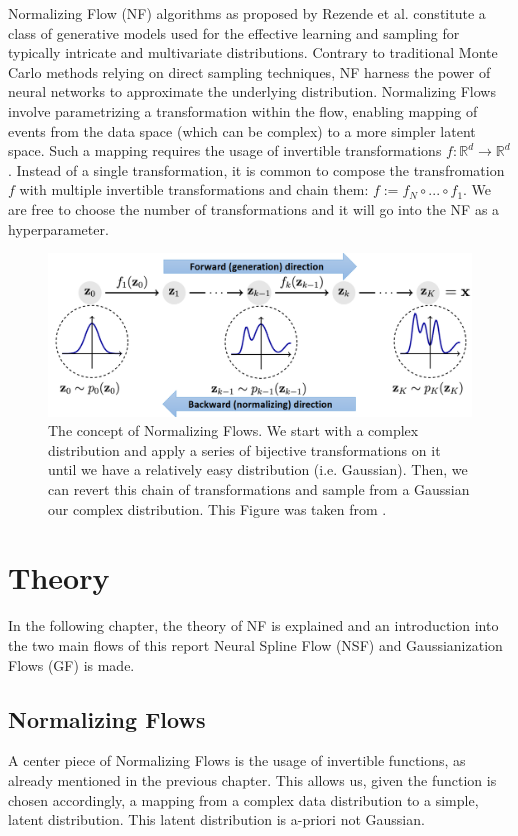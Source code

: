 \documentclass[
nofootinbib,
 amsmath,amssymb,
 aps,
]{revtex4-2}
\begin{document}
Normalizing Flow (NF) algorithms as proposed by Rezende et al. \cite{NF} constitute a class of generative models used for the effective learning and sampling for typically intricate and multivariate distributions. Contrary to traditional Monte Carlo methods relying on direct sampling techniques, NF harness the power of neural networks to approximate the underlying distribution. Normalizing Flows involve parametrizing a transformation within the flow, enabling mapping of events from the data space (which can be complex) to a more simpler latent space. Such a mapping requires the usage of invertible transformations $f: \mathbb{R}^d \rightarrow \mathbb{R}^d$. Instead of a single transformation, it is common to compose the transfromation $f$ with multiple invertible transformations and chain them: $f := f_N \circ ... \circ f_1$. We are free to choose the number of transformations and it will go into the NF as a hyperparameter. \\ 

\begin{figure}[h!]
\includegraphics[scale=0.90]{Plots/NF_intro.png}
\caption{\label{fig:NF_intro} The concept of Normalizing Flows. We start with a complex distribution and apply a series of bijective transformations on it until we have a relatively easy distribution (i.e. Gaussian). Then, we can revert this chain of transformations and sample from a Gaussian our complex distribution. This Figure was taken from \cite{NF_Intro}. }
\end{figure}

\newpage

\section{Theory}
In the following chapter, the theory of NF is explained and an introduction into the two main flows of this report Neural Spline Flow (NSF) and Gaussianization Flows (GF) \cite{NSF, GF} is made.

\subsection{Normalizing Flows}
A center piece of Normalizing Flows is the usage of invertible functions, as already mentioned in the previous chapter. This allows us, given the function is chosen accordingly, a mapping from a complex data distribution to a simple, latent distribution. This latent distribution is a-priori not Gaussian. \\
\end{document}
